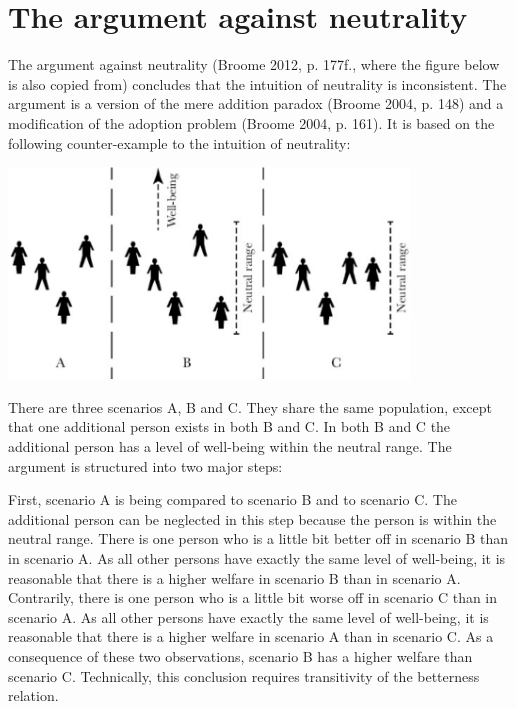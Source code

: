 \section{The argument against neutrality}

The argument against neutrality (\label{ref:RNDVrb2Fg6EjX}Broome 2012, p. 177f., where the figure below is also copied from) concludes that the intuition of neutrality is inconsistent. The argument is a version of the mere addition paradox (\label{ref:RNDn8ybKRhpdp}Broome 2004, p. 148) and a modification of the adoption problem (\label{ref:RND0coQvEEBxt}Broome 2004, p. 161). It is based on the following counter-example to the intuition of neutrality:  

\begin{center}
  \includegraphics[width=0.8\textwidth]{3-fig-1}
\end{center}

There are three scenarios A, B and C. They share the same population, except that one additional person exists in both B and C. In both B and C the additional person has a level of well-being within the neutral range. The argument is structured into two major steps:  

First, scenario A is being compared to scenario B and to scenario C. The additional person can be neglected in this step because the person is within the neutral range. There is one person who is a little bit better off in scenario B than in scenario A. As all other persons have exactly the same level of well-being, it is reasonable that there is a higher welfare in scenario B than in scenario A. Contrarily, there is one person who is a little bit worse off in scenario C than in scenario A. As all other persons have exactly the same level of well-being, it is reasonable that there is a higher welfare in scenario A than in scenario C. As a consequence of these two observations, scenario B has a higher welfare than scenario C. Technically, this conclusion requires transitivity of the betterness relation.  

